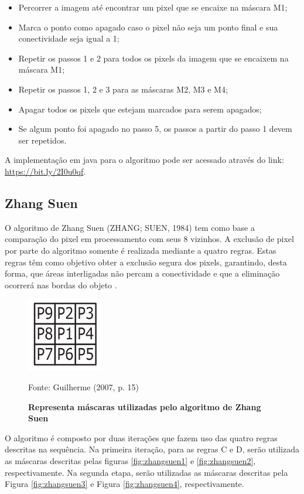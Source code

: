 \documentclass[
	12pt,				%
	oneside,			%
	a4paper,			%
	english,			%
	french,				%
	spanish,			%
	brazil,				%
	]{abntex2}
\begin{document}
\begin{itemize}
\item Percorrer a imagem até encontrar um pixel que se encaixe na máscara M1;
\item Marca o ponto como apagado caso o pixel não seja um ponto final e sua conectividade seja igual a 1;
\item Repetir os passos 1 e 2 para todos os pixels da imagem que se encaixem na máscara M1;
\item Repetir os passos 1, 2 e 3 para as máscaras M2, M3 e M4;
\item Apagar todos os pixels que estejam marcados para serem apagados;
\item Se algum ponto foi apagado no passo 5, os passos a partir do passo 1 devem ser repetidos.
\end{itemize}

A implementação em java para o algoritmo pode ser acessado através do link: \url{https://bit.ly/2I0u0qf}.

\subsection{Zhang Suen}

O algoritmo de Zhang Suen (ZHANG; SUEN, 1984) tem como base a comparação do pixel em processamento com seus 8 vizinhos. A exclusão de pixel por parte do algoritmo somente é realizada mediante a quatro regras. Estas regras têm como objetivo obter a exclusão segura dos pixels, garantindo, desta forma, que áreas interligadas não percam a conectividade e que a eliminação ocorrerá nas bordas do objeto \cite{guilherme:2007}.

\begin{figure}[ht]
\centering
\caption{\textbf{Representa máscaras utilizadas pelo algoritmo de Zhang Suen}}
\includegraphics[width=0.3\textwidth]{imagens/zhangsuen_mascara.png}

Fonte: Guilherme (2007, p. 15)
\label{fig:zhangsuen_mascara}
\end{figure}

O algoritmo é composto por duas iterações que fazem uso das quatro regras descritas na sequência. Na primeira iteração, para as regras C e D, serão utilizada as máscaras descritas pelas figuras  \ref{fig:zhangsuen1} e \ref{fig:zhangsuen2}, respectivamente. Na segunda etapa, serão utilizadas as máscaras descritas pela Figura \ref{fig:zhangsuen3} e Figura \ref{fig:zhangsuen4}, respectivamente.
\end{document}
